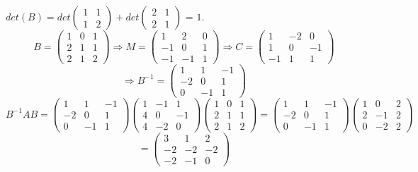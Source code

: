 \documentclass[12pt]{article}
\begin{document}
$det(B) = det\begin{pmatrix} 1 & 1 \\ 1 & 2 \end{pmatrix} +  det\begin{pmatrix} 2 & 1 \\ 2 & 1\end{pmatrix}$ = $1$. 
$$B = \begin{pmatrix} 1 & 0 & 1 \\ 2 & 1 & 1 \\ 2 & 1 & 2 \end{pmatrix} \Rightarrow M = \begin{pmatrix} 1 & 2 & 0 \\ -1 & 0 & 1 \\ -1 & -1 & 1\end{pmatrix} \Rightarrow C = \begin{pmatrix} 1 & -2 & 0 \\ 1 & 0 & -1 \\ -1 & 1 & 1\end{pmatrix}$$
$$\Rightarrow B^{-1} = \begin{pmatrix} 1 & 1 & -1 \\ -2 & 0 & 1 \\ 0 & -1 & 1\end{pmatrix}$$
$$B^{-1}AB = \begin{pmatrix} 1 & 1 & -1 \\ -2 & 0 & 1 \\ 0 & -1 & 1\end{pmatrix} \begin{pmatrix} 1 & -1 & 1 \\ 4 & 0 & -1 \\ 4 & -2 & 0 \end{pmatrix} \begin{pmatrix} 1 & 0 & 1 \\ 2 & 1 & 1 \\ 2 & 1 & 2 \end{pmatrix}= \begin{pmatrix} 1 & 1 & -1 \\ -2 & 0 & 1 \\ 0 & -1 & 1\end{pmatrix}\begin{pmatrix} 1 & 0 & 2 \\ 2 & -1 & 2 \\ 0 & -2 & 2\end{pmatrix}$$ 
$$ = \begin{pmatrix} 3 & 1 & 2 \\ -2 & -2 & -2 \\ -2 & -1 & 0\end{pmatrix}$$
\end{document}
